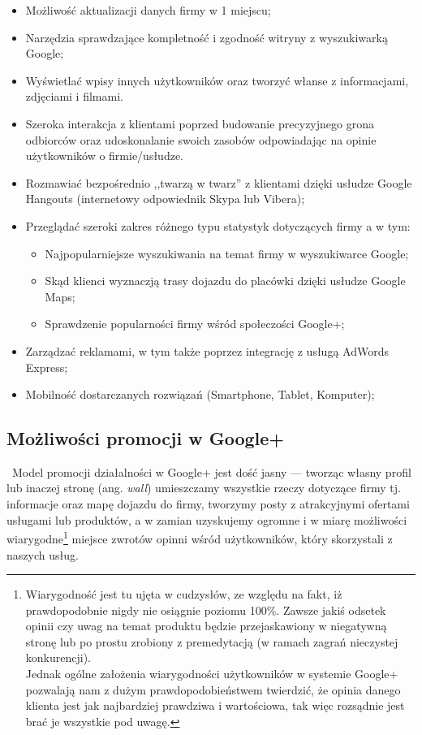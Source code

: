 \begin{itemize}
\item Możliwość aktualizacji danych firmy w 1 miejscu;

\item Narzędzia sprawdzające kompletność i zgodność witryny z wyszukiwarką \mbox{Google};

\item Wyświetlać wpisy innych użytkowników oraz tworzyć włanse z informacjami, zdjęciami i filmami.

\item Szeroka interakcja z klientami poprzed budowanie precyzyjnego grona odbiorców oraz udoskonalanie swoich zasobów odpowiadając na opinie użytkowników o firmie/usłudze.

\item Rozmawiać bezpośrednio ,,twarzą w twarz'' z klientami dzięki usłudze Google Hangouts (internetowy odpowiednik Skypa lub Vibera);

\item Przeglądać szeroki zakres różnego typu statystyk dotyczących firmy a w tym:
    \begin{itemize}
    \item Najpopularniejsze wyszukiwania na temat firmy w wyszukiwarce Google;
    \item Skąd klienci wyznaczją trasy dojazdu do placówki dzięki usłudze Google Maps;
    \item Sprawdzenie popularności firmy wśród społeczości Google+;
    \end{itemize}

\item Zarządzać reklamami, w tym także poprzez integrację z usługą AdWords Express;

\item Mobilność dostarczanych rozwiązań (Smartphone, Tablet, Komputer);
\end{itemize}


\subsection{Możliwości promocji w Google+}
\
Model promocji działalności w Google+ jest dość jasny --- tworząc własny profil lub inaczej stronę (ang. \textit{wall}) umieszczamy wszystkie rzeczy dotyczące firmy tj. informacje oraz mapę dojazdu do firmy, tworzymy posty z atrakcyjnymi ofertami usługami lub produktów, a w zamian uzyskujemy ogromne i w miarę możliwości wiarygodne\footnote{Wiarygodność jest tu ujęta w cudzysłów, ze względu na fakt, iż prawdopodobnie nigdy nie osiągnie poziomu 100\%. Zawsze jakiś odsetek opinii czy uwag na temat produktu będzie przejaskawiony w niegatywną stronę lub po prostu zrobiony z premedytacją (w ramach zagrań nieczystej konkurencji).\\ Jednak ogólne założenia wiarygodności użytkowników w systemie Google+ pozwalają nam z dużym prawdopodobieństwem twierdzić, że opinia danego klienta jest jak najbardziej prawdziwa i wartościowa, tak więc rozsądnie jest brać je wszystkie pod uwagę.} miejsce zwrotów opinni wśród użytkowników, który skorzystali z naszych usług. 

